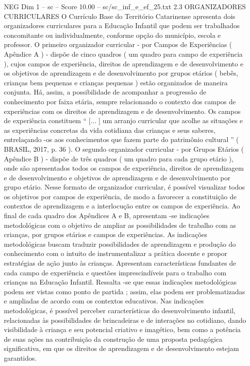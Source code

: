 \begin{textsample}{NEG Dim 1 – sc – Score 10.00 – sc/sc\_inf\_e\_ef\_25.txt}  \label{ex:f1_neg_278}
2.3 ORGANIZADORES CURRICULARES O Currículo Base do Território Catarinense apresenta dois organizadores curriculares para a Educação Infantil que podem ser trabalhados concomitante ou individualmente, conforme opção do município, escola e professor.
O primeiro organizador curricular - por Campos de Experiências ( Apêndice A ) - dispõe de cinco quadros ( um quadro para campo de experiência ), cujos campos de experiência, direitos de aprendizagem e de desenvolvimento e os objetivos de aprendizagem e de desenvolvimento por grupos etários ( bebês, crianças bem pequenas e crianças pequenas ) estão organizados de maneira conjunta.
Há, assim, a possibilidade de acompanhar a progressão de conhecimento por faixa etária, sempre relacionando o contexto dos campos de experiências com os direitos de aprendizagem e de desenvolvimento.
Os campos de experiência constituem “ [... ] um arranjo curricular que acolhe as situações e as experiências concretas da vida cotidiana das crianças e seus saberes, entrelaçando -os aos conhecimentos que fazem parte do patrimônio cultural ” ( BRASIL, 2017, p. 36 ).
O segundo organizador curricular - por Grupos Etários ( Apêndice B ) - dispõe de três quadros ( um quadro para cada grupo etário ), onde são apresentados todos os campos de experiência, direitos de aprendizagem e de desenvolvimento e objetivos de aprendizagem e de desenvolvimento por grupo etário.
Nesse formato de organizador curricular, é possível visualizar todos os objetivos por campos de experiência, de modo a favorecer a constituição de contextos de aprendizagem e a interlocução entre os campos de experiência.
Ao final de cada quadro dos Apêndices A e B, apresentam -se indicações metodológicas com o objetivo de ampliar as possibilidades de trabalho com as crianças, por grupos etários e campos de experiências.
As indicações metodológicas buscam traduzir possibilidades de aprendizagem e produção do conhecimento com o intuito de instrumentalizar a prática docente e propor estratégias de ação junto às crianças.
Apresentam características fundantes de cada campo de experiência e questões imprescindíveis para o trabalho com crianças na Educação Infantil.
Ressalta -se que essas indicações metodológicas podem ser vistas como ponto de partida ; assim, elas podem ser problematizadas e ampliadas de acordo com os contextos educativos.
Nas indicações metodológicas, é possível perceber características do desenvolvimento infantil, relacionadas às possibilidades de brincadeiras e de interações no cotidiano, dando visibilidade à criança e seu potencial criativo e imagético, bem como a potência de suas ações na contribuição da construção de uma proposta pedagógica significativa, em que os direitos de aprendizagem e de desenvolvimento estejam garantidos.

\end{textsample}
